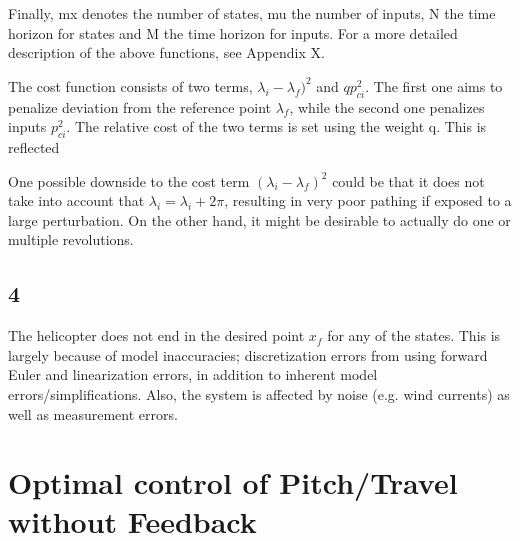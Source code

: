 Finally, mx denotes the number of states, mu the number of inputs, N the time horizon for states and M the time horizon for inputs. For a more detailed description of the above functions, see Appendix X. 

The cost function  consists of two terms, $\lambda_i - \lambda_f)^2$ and $qp_{ci}^2$. The first one aims to penalize deviation from the reference point $\lambda_f$, while the second one penalizes inputs $p_{ci}^2$. The relative cost of the two terms is set using the weight q. This is reflected 

One possible downside to the cost term $(\lambda_i - \lambda_f)^2$ could be that it does not take into account that $\lambda_i = \lambda_ i + 2\pi$, resulting in very poor pathing if exposed to a large perturbation. On the other hand, it might be desirable to actually do one or multiple revolutions.

\subsection{4}
The helicopter does not end in the desired point $x_f$ for any of the states. This is largely  because of model inaccuracies; discretization errors from using forward Euler and linearization errors, in addition to inherent model errors/simplifications. Also, the system is affected by noise (e.g. wind currents) as well as measurement errors.

\section{Optimal control of Pitch/Travel without Feedback}
